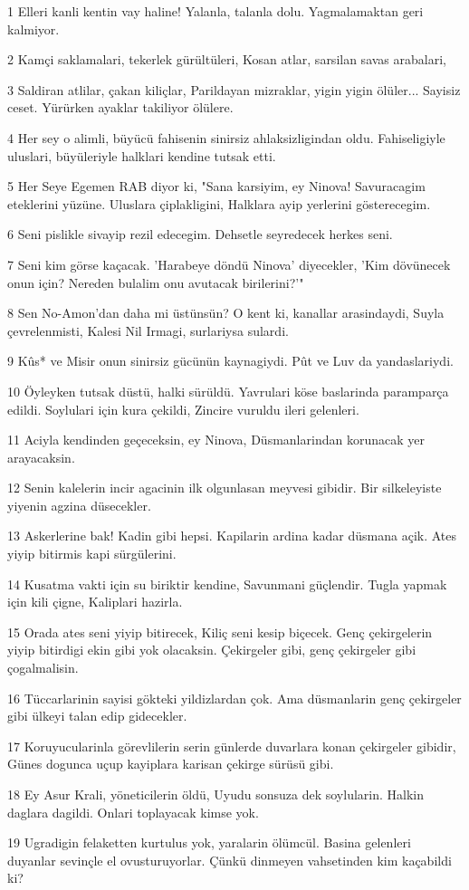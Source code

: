 \par 1 Elleri kanli kentin vay haline! Yalanla, talanla dolu. Yagmalamaktan geri kalmiyor.
\par 2 Kamçi saklamalari, tekerlek gürültüleri, Kosan atlar, sarsilan savas arabalari,
\par 3 Saldiran atlilar, çakan kiliçlar, Parildayan mizraklar, yigin yigin ölüler... Sayisiz ceset. Yürürken ayaklar takiliyor ölülere.
\par 4 Her sey o alimli, büyücü fahisenin sinirsiz ahlaksizligindan oldu. Fahiseligiyle uluslari, büyüleriyle halklari kendine tutsak etti.
\par 5 Her Seye Egemen RAB diyor ki, "Sana karsiyim, ey Ninova! Savuracagim eteklerini yüzüne. Uluslara çiplakligini, Halklara ayip yerlerini gösterecegim.
\par 6 Seni pislikle sivayip rezil edecegim. Dehsetle seyredecek herkes seni.
\par 7 Seni kim görse kaçacak. 'Harabeye döndü Ninova' diyecekler, 'Kim dövünecek onun için? Nereden bulalim onu avutacak birilerini?'"
\par 8 Sen No-Amon'dan daha mi üstünsün? O kent ki, kanallar arasindaydi, Suyla çevrelenmisti, Kalesi Nil Irmagi, surlariysa sulardi.
\par 9 Kûs* ve Misir onun sinirsiz gücünün kaynagiydi. Pût ve Luv da yandaslariydi.
\par 10 Öyleyken tutsak düstü, halki sürüldü. Yavrulari köse baslarinda paramparça edildi. Soylulari için kura çekildi, Zincire vuruldu ileri gelenleri.
\par 11 Aciyla kendinden geçeceksin, ey Ninova, Düsmanlarindan korunacak yer arayacaksin.
\par 12 Senin kalelerin incir agacinin ilk olgunlasan meyvesi gibidir. Bir silkeleyiste yiyenin agzina düsecekler.
\par 13 Askerlerine bak! Kadin gibi hepsi. Kapilarin ardina kadar düsmana açik. Ates yiyip bitirmis kapi sürgülerini.
\par 14 Kusatma vakti için su biriktir kendine, Savunmani güçlendir. Tugla yapmak için kili çigne, Kaliplari hazirla.
\par 15 Orada ates seni yiyip bitirecek, Kiliç seni kesip biçecek. Genç çekirgelerin yiyip bitirdigi ekin gibi yok olacaksin. Çekirgeler gibi, genç çekirgeler gibi çogalmalisin.
\par 16 Tüccarlarinin sayisi gökteki yildizlardan çok. Ama düsmanlarin genç çekirgeler gibi ülkeyi talan edip gidecekler.
\par 17 Koruyucularinla görevlilerin serin günlerde duvarlara konan çekirgeler gibidir, Günes dogunca uçup kayiplara karisan çekirge sürüsü gibi.
\par 18 Ey Asur Krali, yöneticilerin öldü, Uyudu sonsuza dek soylularin. Halkin daglara dagildi. Onlari toplayacak kimse yok.
\par 19 Ugradigin felaketten kurtulus yok, yaralarin ölümcül. Basina gelenleri duyanlar sevinçle el ovusturuyorlar. Çünkü dinmeyen vahsetinden kim kaçabildi ki?


